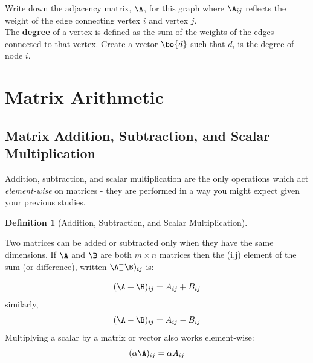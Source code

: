 \documentclass[
]{article}
\theoremstyle{definition}
\newtheorem{definition}{Definition}[section]
\theoremstyle{definition}
\theoremstyle{definition}
\theoremstyle{definition}
\theoremstyle{remark}
\begin{document}
Write down the adjacency matrix, \(\A\), for this graph where \(\A_{ij}\) reflects the weight of the edge connecting vertex \(i\) and vertex \(j\).\\

The \textbf{degree} of a vertex is defined as the sum of the weights of the edges connected to that vertex. Create a vector \(\bo{d}\) such that \(d_i\) is the degree of node \(i\).\\

\hypertarget{mult}{%
\section{Matrix Arithmetic}\label{mult}}

\hypertarget{matrix-addition-subtraction-and-scalar-multiplication}{%
\subsection{Matrix Addition, Subtraction, and Scalar Multiplication}\label{matrix-addition-subtraction-and-scalar-multiplication}}

Addition, subtraction, and scalar multiplication are the only operations which act \emph{element-wise} on matrices - they are performed in a way you might expect given your previous studies.

\begin{definition}[Addition, Subtraction, and Scalar Multiplication]
\protect\hypertarget{def:addsubdef}{}\label{def:addsubdef}

Two matrices can be added or subtracted only when they have the same dimensions. If \(\A\) and \(\B\) are both \(m\times n\) matrices then the (i,j) element of the sum (or difference), written \(\A _-^+ \B)_{ij}\) is:

\[(\A+\B)_{ij}=A_{ij}+B_{ij}\]
similarly,
\[(\A-\B)_{ij}=A_{ij}-B_{ij}\]
Multiplying a scalar by a matrix or vector also works element-wise:
\[(\alpha\A)_{ij}=\alpha A_{ij}\]

\end{definition}
\end{document}

